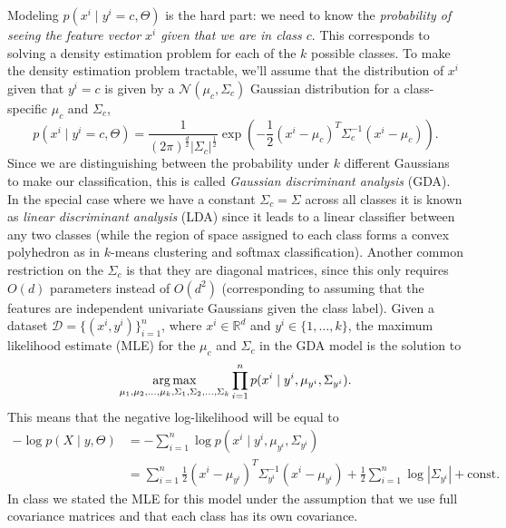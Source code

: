 \documentclass{article}
\def\R{\mathbb{R}}
\def\argmax{\mathop{\rm arg\,max}}
\newcommand{\alignStar}[1]{\begin{align*}#1\end{align*}}
\def\half{\frac 1 2}
\def\cond{\; | \;}
\begin{document}
Modeling $p(x^i \cond y^i =c, \Theta)$ is the hard part: we need to know the \emph{probability of seeing the feature vector $x^i$ given that we are in class $c$}. This corresponds to solving a density estimation problem for each of the $k$ possible classes. 
To make the density estimation problem tractable, we'll assume that the distribution of $x^i$ given that $y^i=c$ is given by a $\mathcal{N}(\mu_c,\Sigma_c)$ Gaussian distribution for a class-specific $\mu_c$ and $\Sigma_c$,
\[
p(x^i \cond y^i=c, \Theta) = \frac{1}{(2\pi)^{\frac{d}{2}}|\Sigma_c|^{\half}}\exp\left(-\half (x^i-\mu_c)^T\Sigma_c^{-1}(x^i-\mu_c)\right).
\]
Since we are distinguishing between the probability under $k$ different Gaussians to make our classification, this is called \emph{Gaussian discriminant analysis} (GDA). In the special case where we have a constant $\Sigma_c = \Sigma$ across all classes it is known as \emph{linear discriminant analysis} (LDA) since it leads to a linear classifier between any two classes (while the region of space assigned to each class forms a convex polyhedron as in $k$-means clustering and softmax classification). Another common restriction on the $\Sigma_c$ is that they are diagonal matrices, since this only requires $O(d)$ parameters instead of $O(d^2)$ (corresponding to assuming that the features are independent univariate Gaussians given the class label).
Given a dataset $\mathcal{D}=\{(x^i, y^i)\}_{i=1}^n$, where $x^i\in\R^d$ and $y^i\in\{1,\ldots,k\}$, the maximum likelihood estimate (MLE) for the $\mu_c$ and $\Sigma_c$ in the GDA model is the solution to
\[
\argmax_{\mu_1,\mu_2,\dots,\mu_k,\Sigma_1,\Sigma_2,\dots,\Sigma_k} \prod_{i=1}^n p(x^i \cond y^i, \mu_{y^i},\Sigma_{y^i}).
\]
This means that the negative log-likelihood will be  equal to
\alignStar{
- \log p(X\cond y,\Theta) & = -\sum_{i=1}^n \log p(x^i \cond y^i, \mu_{y^i},\Sigma_{y^i})\\
& = \sum_{i=1}^n \frac{1}{2}(x^i - \mu_{y^i})^T\Sigma_{y^i}^{-1}(x^i - \mu_{y^i}) + \half\sum_{i=1}^n \log|\Sigma_{y^i}| + \text{const.}
}
In class we stated the MLE for this model under the assumption that we use full covariance matrices and that each class has its own covariance.
\end{document}
